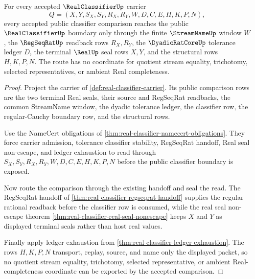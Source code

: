 \begin{theorem}
\label{thm:realclassifier-regseqrat-window-exhaustion}
For every accepted $\RealClassifierUp$ carrier
$$
Q=(X,Y,S_X,S_Y,R_X,R_Y,W,D,C,E,H,K,P,N),
$$
every accepted public classifier comparison reaches the public $\RealClassifierUp$ boundary only through the finite $\StreamNameUp$ window $W$, the $\RegSeqRatUp$ readback rows $R_X,R_Y$, the $\DyadicRatCoreUp$ tolerance ledger $D$, the terminal $\RealUp$ seal rows $X,Y$, and the structural rows $H,K,P,N$. The route has no coordinate for quotient stream equality, trichotomy, selected representatives, or ambient Real completeness.
\end{theorem}
\begin{proof}
Project the carrier of \autoref{def:real-classifier-carrier}. Its public comparison rows are the two terminal Real seals, their source and RegSeqRat readbacks, the common StreamName window, the dyadic tolerance ledger, the classifier row, the regular-Cauchy boundary row, and the structural rows.

Use the NameCert obligations of \autoref{thm:real-classifier-namecert-obligations}. They force carrier admission, tolerance classifier stability, RegSeqRat handoff, Real seal non-escape, and ledger exhaustion to read through $S_X,S_Y,R_X,R_Y,W,D,C,E,H,K,P,N$ before the public classifier boundary is exposed.

Now route the comparison through the existing handoff and seal the read. The RegSeqRat handoff of \autoref{thm:real-classifier-regseqrat-handoff} supplies the regular-rational readback before the classifier row is consumed, while the real seal non-escape theorem \autoref{thm:real-classifier-real-seal-nonescape} keeps $X$ and $Y$ as displayed terminal seals rather than host real values.

Finally apply ledger exhaustion from \autoref{thm:real-classifier-ledger-exhaustion}. The rows $H,K,P,N$ transport, replay, source, and name only the displayed packet, so no quotient stream equality, trichotomy, selected representative, or ambient Real-completeness coordinate can be exported by the accepted comparison.
\end{proof}

